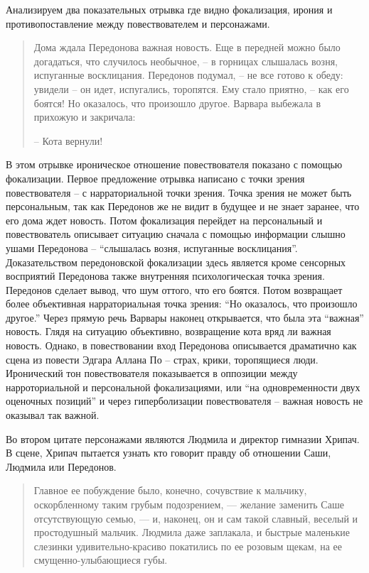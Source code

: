 \documentclass[12pt,a4paper]{article}
\begin{document}
Анализируем два показательных отрывка где видно фокализация, ирония и противопоставление между повествователем и персонажами.

\begin{quote}
Дома ждала Передонова важная новость. Еще в передней можно
было догадаться, что случилось необычное, – в горницах слышалась 
возня, испуганные восклицания. Передонов подумал, – не все
готово к обеду: увидели – он идет, испугались, торопятся. Ему стало
приятно, – как его боятся! Но оказалось, что произошло другое. 
Варвара выбежала в прихожую и закричала:

– Кота вернули!

\parencite[171.]{sologub2004}

\end{quote}

В этом отрывке ироническое отношение повествователя показано с помощью фокализации. Первое предложение отрывка написано с точки зрения повествователя – с нарраториальной точки зрения. Точка зрения не может быть персональным, так как Передонов же не видит в будущее и не знает заранее, что его дома ждет новость. Потом фокализация перейдет на персональный и повествователь описывает ситуацию сначала с помощью информации слышно ушами Передонова – \enquote{слышалась 
возня, испуганные восклицания}. Доказательством передоновской фокализации здесь является кроме сенсорных восприятий Передонова также внутренняя психологическая точка зрения. Передонов сделает вывод, что шум оттого, что его боятся. Потом возвращает более объективная нарраториальная точка зрения: \enquote{Но оказалось, что произошло другое.} Через прямую речь Варвары наконец открывается, что была эта \enquote{важная} новость.
Глядя на ситуацию объективно, возвращение кота вряд ли важная новость. Однако, в повествовании вход Передонова описывается драматично как сцена из повести Эдгара Аллана По – страх, крики, торопящиеся люди. Иронический тон повествователя показывается  в оппозиции между нарроториальной и персональной фокализациями, или \enquote{на одновременности двух оценочных позиций} и через гиперболизации повествователя – важная новость не оказывал так важной. 

Во втором цитате персонажами являются Людмила и директор гимназии Хрипач. В сцене, Хрипач пытается узнать кто говорит правду об отношении Саши, Людмила или Передонов. 

\begin{quote}
Главное ее побуждение было,
конечно, сочувствие к мальчику, оскорбленному таким грубым 
подозрением, — желание заменить Саше отсутствующую семью, — и, 
наконец, он и сам такой славный, веселый и простодушный мальчик. 
Людмила даже заплакала, и быстрые маленькие слезинки 
удивительно-красиво покатились по ее розовым щекам, на ее смущенно-улыбающиеся
губы. 

\parencite[239.]{sologub2004}
\end{quote}
\end{document}

